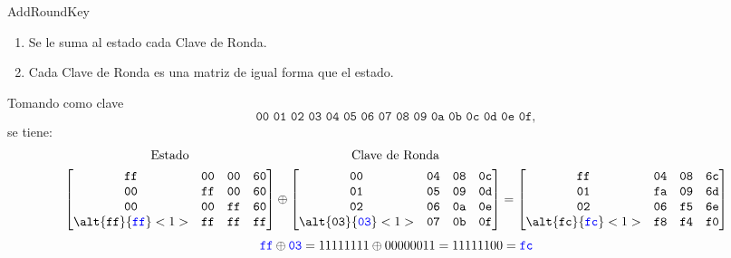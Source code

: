 \documentclass[10pt,t]{beamer}
\begin{document}
\begin{frame}
    \begin{block}{\centering AddRoundKey}
        \begin{enumerate}[label=--]
            \item Se le suma al estado cada Clave de Ronda.
            \item Cada Clave de Ronda es una matriz de igual forma que el estado.
        \end{enumerate}
    \end{block}
    Tomando como clave
    \[\texttt{00 01 02 03 04 05 06 07 08 09 0a 0b 0c 0d 0e 0f},\]
    se tiene:
    \[
        \overset{\raisebox{6pt}{\normalsize Estado}}{
            \begin{bmatrix}
                \texttt{ff}                                         & \texttt{00} & \texttt{00} & \texttt{60} \\
                \texttt{00}                                         & \texttt{ff} & \texttt{00} & \texttt{60} \\
                \texttt{00}                                         & \texttt{00} & \texttt{ff} & \texttt{60} \\
                \alt{\texttt{ff}}{\textcolor{azul}{\texttt{ff}}}<1> & \texttt{ff} & \texttt{ff} & \texttt{ff}
            \end{bmatrix}}
        \oplus
        \overset{\raisebox{6pt}{\normalsize Clave de Ronda}}{
            \begin{bmatrix}
                \texttt{00}                                         & \texttt{04} & \texttt{08} & \texttt{0c} \\
                \texttt{01}                                         & \texttt{05} & \texttt{09} & \texttt{0d} \\
                \texttt{02}                                         & \texttt{06} & \texttt{0a} & \texttt{0e} \\
                \alt{\texttt{03}}{\textcolor{azul}{\texttt{03}}}<1> & \texttt{07} & \texttt{0b} & \texttt{0f}
            \end{bmatrix}}
        =
        \begin{bmatrix}
            \texttt{ff}                                          & \texttt{04} & \texttt{08} & \texttt{6c} \\
            \texttt{01}                                          & \texttt{fa} & \texttt{09} & \texttt{6d} \\
            \texttt{02}                                          & \texttt{06} & \texttt{f5} & \texttt{6e} \\
            \alt{\texttt{fc}}{\textcolor{verde}{\texttt{fc}}}<1> & \texttt{f8} & \texttt{f4} & \texttt{f0}
        \end{bmatrix}
    \]
    \pause
    \[\textcolor{azul}{\texttt{ff}} \oplus \textcolor{azul}{\texttt{03}} = 11111111 \oplus 00000011 = 11111100 = \textcolor{verde}{\texttt{fc}}\]

\end{frame}
\end{document}
